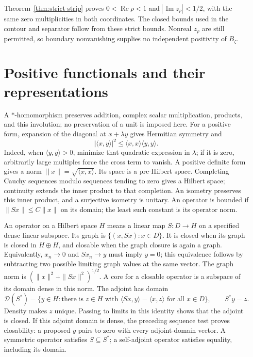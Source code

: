 Theorem~\ref{thm:strict-strip} proves
$0<\operatorname{Re}\rho<1$ and $|\operatorname{Im}z_\rho|<1/2$,
with the same zero multiplicities in both coordinates.
The closed bounds used in the contour and separator follow from these
strict bounds.  Nonreal $z_\rho$ are still permitted, so boundary
nonvanishing supplies no independent positivity of $B_\zeta$.

\section{Positive functionals and their representations}

A $*$-homomorphism preserves addition, complex scalar multiplication,
products, and this involution; no preservation of a unit is imposed here.
For a positive form, expansion of the diagonal at $x+\lambda y$ gives
Hermitian symmetry and
\[
 |\langle x,y\rangle|^2\leq\langle x,x\rangle\langle y,y\rangle.
\]
Indeed, when $\langle y,y\rangle>0$, minimize that quadratic expression in
$\lambda$; if it is zero, arbitrarily large multiples force the cross term
to vanish.  A positive definite form gives a norm
$\|x\|=\sqrt{\langle x,x\rangle}$.  Its space is a pre-Hilbert space.
Completing Cauchy sequences modulo sequences tending to zero gives a
Hilbert space; continuity extends the inner product to that completion.
An isometry preserves this inner product, and a surjective isometry is
unitary.  An operator is bounded if $\|Sx\|\leq C\|x\|$ on its domain;
the least such constant is its operator norm.

An operator on a Hilbert space $H$ means a linear map $S:D\to H$ on a
specified dense linear subspace.  Its graph is $\{(x,Sx):x\in D\}$.
It is closed when its graph is closed in $H\oplus H$, and closable when
the graph closure is again a graph.  Equivalently, $x_n\to0$ and
$Sx_n\to y$ must imply $y=0$; this equivalence follows by subtracting two
possible limiting graph values at the same vector.
The graph norm is $(\|x\|^2+\|Sx\|^2)^{1/2}$.  A core for a closable
operator is a subspace of its domain dense in this norm.
The adjoint has domain
\[
 \mathcal D(S^*)=\{y\in H:\text{there is }z\in H\text{ with }
           \langle Sx,y\rangle=\langle x,z\rangle\text{ for all }x\in D\},
 \qquad S^*y=z.
\]
Density makes $z$ unique.  Passing to limits in this identity shows that
the adjoint is closed.  If this adjoint domain is dense, the preceding
sequence test proves closability: a proposed $y$ pairs to zero with every
adjoint-domain vector.  A symmetric operator satisfies $S\subseteq S^*$;
a self-adjoint operator satisfies equality, including its domain.

